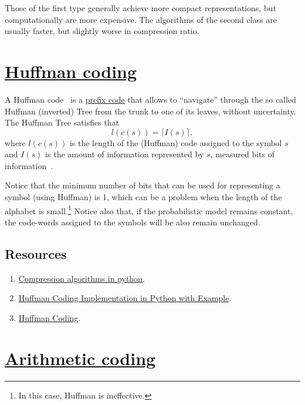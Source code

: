 Those of the first type generally achieve more compact
representations, but computationally are more expensive. The
algorithms of the second class are usually faster, but slightly worse
in compression ratio.

\section{\href{https://en.wikipedia.org/wiki/Huffman_coding}{Huffman coding}}

A Huffman code~\cite{vruiz__huffman_coding} is a
\href{https://en.wikipedia.org/wiki/Prefix_code}{prefix code} that
allows to ``navigate'' through the so called Huffman (inverted) Tree
from the trunk to one of its leaves, without
uncertainty. The Huffman Tree satisfies that
\begin{equation}
  l(c(s)) = \lceil I(s)\rceil,
  \label{eq:huffman_performance}
\end{equation}
where $l(c(s))$ is the length of the (Huffman) code assigned to the
symbol $s$ and $I(s)$ is the amount of information represented by $s$,
measured bits of information~\cite{vruiz__information_theory}.

Notice that the minimum number of bits that can be used for
representing a symbol (using Huffman) is 1, which can be a problem
when the length of the alphabet is small.\footnote{In this case,
  Huffman is ineffective.} Notice also that, if the probabilistic model
remains constant, the code-words assigned to the symbols will be also
remain unchanged.

\subsection*{Resources}
\begin{enumerate}
\item \href{https://www.inference.org.uk/mackay/python/compress/#Huff}{Compression algorithms in python}.
\item \href{https://favtutor.com/blogs/huffman-coding}{Huffman Coding Implementation in Python with Example}.
\item \href{https://www.programiz.com/dsa/huffman-coding}{Huffman Coding}.
\end{enumerate}

\section{\href{https://en.wikipedia.org/wiki/Arithmetic_coding}{Arithmetic
    coding}}

